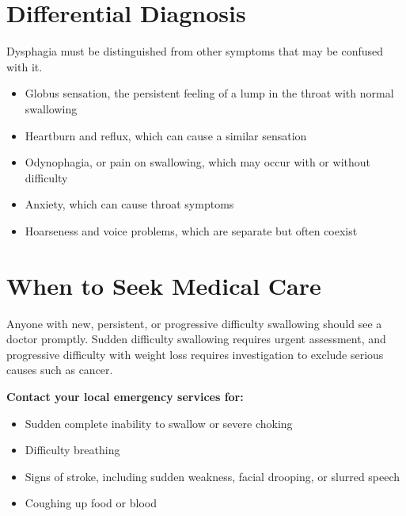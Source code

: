 \section*{Differential Diagnosis}
Dysphagia must be distinguished from other symptoms that may be confused with it.
\begin{itemize}
    \item Globus sensation, the persistent feeling of a lump in the throat with normal swallowing
    \item Heartburn and reflux, which can cause a similar sensation
    \item Odynophagia, or pain on swallowing, which may occur with or without difficulty
    \item Anxiety, which can cause throat symptoms
    \item Hoarseness and voice problems, which are separate but often coexist
\end{itemize}

\section*{When to Seek Medical Care}
Anyone with new, persistent, or progressive difficulty swallowing should see a doctor promptly. Sudden difficulty swallowing requires urgent assessment, and progressive difficulty with weight loss requires investigation to exclude serious causes such as cancer.

\textbf{Contact your local emergency services for:}
\begin{itemize}
    \item Sudden complete inability to swallow or severe choking
    \item Difficulty breathing
    \item Signs of stroke, including sudden weakness, facial drooping, or slurred speech
    \item Coughing up food or blood
\end{itemize}

